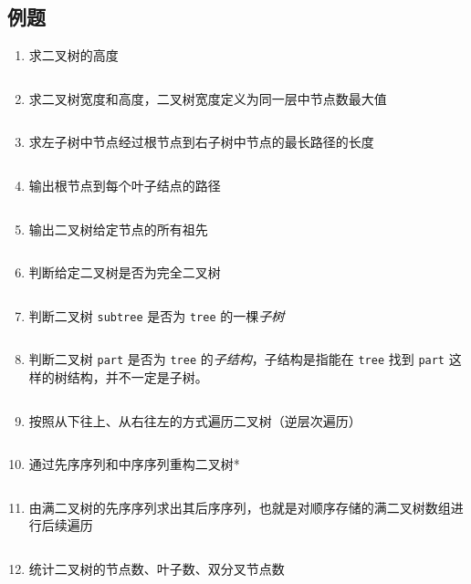 \documentclass{ctexart}
\begin{document}
\subsection{例题}
\begin{enumerate}
    \item 求二叉树的高度
        \inputminted{c}{codes/height-of-bitree.c}

    \item 求二叉树宽度和高度，二叉树宽度定义为同一层中节点数最大值
        \inputminted{c}{codes/height-and-width-of-bitree.c}

    \item 求左子树中节点经过根节点到右子树中节点的最长路径的长度
        \inputminted{c}{codes/max-distance-through-root.c}

    \item 输出根节点到每个叶子结点的路径
        \inputminted{c}{codes/print-all-traces.c}

    \item 输出二叉树给定节点的所有祖先
        \inputminted{c}{codes/print-ancestors.c}

    \item 判断给定二叉树是否为完全二叉树
        \inputminted{c}{codes/is-complete-bitree.c}

    \item 判断二叉树 \texttt{subtree} 是否为 \texttt{tree} 的一棵\emph{子树}
        \inputminted{c}{codes/is-subtree.c}

    \item 判断二叉树 \texttt{part} 是否为 \texttt{tree} 的\emph{子结构}，子结构是指能在 \texttt{tree} 找到 \texttt{part} 这样的树结构，并不一定是子树。
        \inputminted{c}{codes/is-part-of-bitree.c}

    \item 按照从下往上、从右往左的方式遍历二叉树（逆层次遍历）
        \inputminted{c}{codes/re-level-order.c}

    \item 通过先序序列和中序序列重构二叉树*
        \inputminted{c}{codes/rebuild-bitree.c}

    \item 由满二叉树的先序序列求出其后序序列，也就是对顺序存储的满二叉树数组进行后续遍历
        \inputminted{c}{codes/from-preorder-to-postorder.c}

    \item 统计二叉树的节点数、叶子数、双分叉节点数
        \inputminted{c}{codes/statistic-of-bitree.c}


\end{enumerate}
\end{document}
